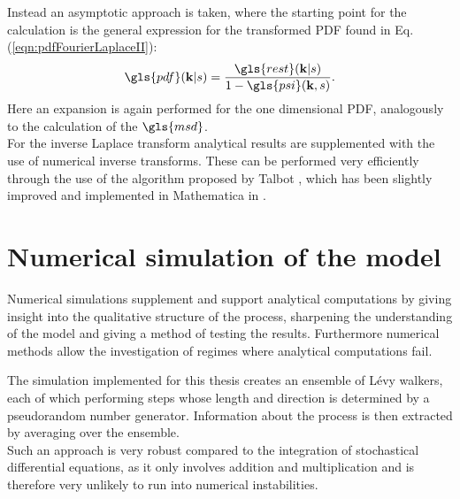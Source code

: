 Instead an asymptotic approach is taken, where the starting point for the calculation is the general expression for the transformed \gls{PDF} found in  Eq. (\ref{eqn:pdfFourierLaplaceII}):
%
\begin{align}
\gls{pdf}(\ve{k}|s) = \frac{ \gls{rest}(\ve{k}|s)}{1 - \gls{psi}(\ve{k},s)}  .
\end{align}
%
Here an expansion is again performed for the one dimensional PDF, analogously to the calculation of the $\gls{msd}$. \\
For the inverse Laplace transform analytical results are supplemented with the use of numerical inverse transforms. These can be performed very efficiently through the use of the algorithm proposed by Talbot \cite{talbot1979}, which has been slightly improved and implemented in Mathematica in \cite{abate2004}.


\section{Numerical simulation of the model}

Numerical simulations supplement and support analytical computations by giving insight into the qualitative structure of the process, sharpening the understanding of the model and giving a method of testing the results. Furthermore numerical methods allow the investigation of regimes where analytical computations fail.

The simulation implemented for this thesis creates an ensemble of L\'evy walkers, each of which performing steps whose length and direction is determined by a pseudorandom number generator. Information about the process is then extracted by averaging over the ensemble. \\
Such an approach is very robust compared to the integration of stochastical differential equations, as it only involves addition and multiplication and is therefore very unlikely to run into numerical instabilities. 

